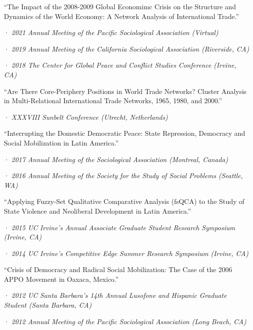 \documentclass[10pt,]{article}
\providecommand{\tightlist}{%
  \setlength{\itemsep}{0pt}\setlength{\parskip}{0pt}}
\renewenvironment{itemize}{
  \begin{list}{}{
    \setlength{\leftmargin}{1.5em}
  }
}{
  \end{list}
}
\begin{document}
\begin{itemize}
\item
  ``The Impact of the 2008-2009 Global Economimc Crisis on the Structure
  and Dynamics of the World Economy: A Network Analysis of International
  Trade.''

  \begin{itemize}
  \tightlist
  \item
    · \emph{2021 Annual Meeting of the Pacific Sociological Association
    (Virtual)}
  \item
    · \emph{2019 Annual Meeting of the California Sociological
    Association (Riverside, CA)}
  \item
    · \emph{2018 The Center for Global Peace and Conflict Studies
    Conference (Irvine, CA)}
  \end{itemize}
\item
  ``Are There Core-Periphery Positions in World Trade Networks? Cluster
  Analysis in Multi-Relational International Trade Networks, 1965, 1980,
  and 2000.''

  \begin{itemize}
  \tightlist
  \item
    · \emph{XXXVIII Sunbelt Conference (Utrecht, Netherlands)}
  \end{itemize}
\item
  ``Interrupting the Domestic Democratic Peace: State Repression,
  Democracy and Social Mobilization in Latin America.''

  \begin{itemize}
  \tightlist
  \item
    · \emph{2017 Annual Meeting of the Sociological Association
    (Montreal, Canada)}
  \item
    · \emph{2016 Annual Meeting of the Society for the Study of Social
    Problems (Seattle, WA)}
  \end{itemize}
\item
  ``Applying Fuzzy-Set Qualitative Comparative Analysis (fsQCA) to the
  Study of State Violence and Neoliberal Development in Latin America.''

  \begin{itemize}
  \tightlist
  \item
    · \emph{2015 UC Irvine's Annual Associate Graduate Student Research
    Symposium (Irvine, CA)}
  \item
    · \emph{2014 UC Irvine's Competitive Edge Summer Research Symposium
    (Irvine, CA)}
  \end{itemize}
\item
  ``Crisis of Democracy and Radical Social Mobilization: The Case of the
  2006 APPO Movement in Oaxaca, Mexico.''

  \begin{itemize}
  \tightlist
  \item
    · \emph{2012 UC Santa Barbara's 14th Annual Lusofone and Hispanic
    Graduate Student (Santa Barbara, CA)}
  \item
    · \emph{2012 Annual Meeting of the Pacific Sociological Association
    (Long Beach, CA)}
  \end{itemize}
\end{itemize}
\end{document}
